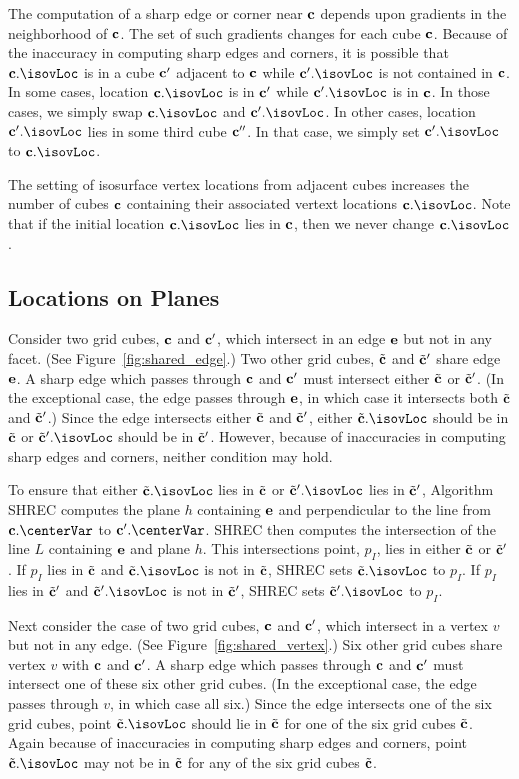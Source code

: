 The computation of a sharp edge or corner near $\mathbf{c}$ depends
upon gradients in the neighborhood of $\mathbf{c}$.
The set of such gradients changes for each cube $\mathbf{c}$.
Because of the inaccuracy in computing sharp edges and corners,
it is possible that $\cb.\isovLoc$ is in a cube $\mathbf{c}'$ adjacent to $\mathbf{c}$
while $\cb'.\isovLoc$ is not contained in $\mathbf{c}$.
In some cases,
location $\cb.\isovLoc$ is in $\mathbf{c}'$ while $\cb'.\isovLoc$ is in $\mathbf{c}$.
In those cases,
we simply swap $\cb.\isovLoc$ and $\cb'.\isovLoc$.
In other cases, location $\cb'.\isovLoc$ lies in some third cube $\mathbf{c}''$.
In that case, we simply set $\cb'.\isovLoc$ to $\cb.\isovLoc$.

The setting of isosurface vertex locations from adjacent cubes
increases the number of cubes $\mathbf{c}$ containing 
their associated vertext locations $\cb.\isovLoc$.
Note that if the initial location $\cb.\isovLoc$ lies in $\mathbf{c}$,
then we never change $\cb.\isovLoc$.


\subsection{Locations on Planes}

Consider two grid cubes, $\mathbf{c}$ and $\mathbf{c}'$, 
which intersect in an edge $\mathbf{e}$ but not in any facet.
(See Figure~\ref{fig:shared_edge}.)
Two other grid cubes, ${\tilde{\mathbf{c}}}$ and ${\tilde{\mathbf{c}}}'$ share edge $\mathbf{e}$.
A sharp edge which passes through $\mathbf{c}$ and $\mathbf{c}'$ must intersect
either ${\tilde{\mathbf{c}}}$ or ${\tilde{\mathbf{c}}}'$.
(In the exceptional case, the edge passes through $\mathbf{e}$,
in which case it intersects both ${\tilde{\mathbf{c}}}$ and ${\tilde{\mathbf{c}}}'$.)
Since the edge intersects either ${\tilde{\mathbf{c}}}$ and ${\tilde{\mathbf{c}}}'$,
either $\tcb.\isovLoc$ should be in ${\tilde{\mathbf{c}}}$ 
or $\tcb'.\isovLoc$ should be in ${\tilde{\mathbf{c}}}'$.
However, because of inaccuracies in computing sharp edges and corners,
neither condition may hold.

To ensure that either $\tcb.\isovLoc$ lies in ${\tilde{\mathbf{c}}}$
or $\tcb'.\isovLoc$ lies in ${\tilde{\mathbf{c}}}'$,
Algorithm SHREC computes the plane $h$ containing $\mathbf{e}$
and perpendicular to the line from $\cb.\centerVar$ to $\cb'.\centerVar$.
SHREC then computes the intersection of the line $L$ containing $\mathbf{e}$
and plane $h$.
This intersections point, $p_I$, lies in either ${\tilde{\mathbf{c}}}$ or ${\tilde{\mathbf{c}}}'$.
If $p_I$ lies in ${\tilde{\mathbf{c}}}$ and $\tcb.\isovLoc$ is not in ${\tilde{\mathbf{c}}}$,
SHREC sets $\tcb.\isovLoc$ to $p_I$.
If $p_I$ lies in ${\tilde{\mathbf{c}}}'$ and $\tcb'.\isovLoc$ is not in ${\tilde{\mathbf{c}}}'$,
SHREC sets $\tcb'.\isovLoc$ to $p_I$.

Next consider the case of two grid cubes, $\mathbf{c}$ and $\mathbf{c}'$, 
which intersect in a vertex $v$ but not in any edge.
(See Figure~\ref{fig:shared_vertex}.)
Six other grid cubes share vertex $v$ with $\mathbf{c}$ and $\mathbf{c}'$.
A sharp edge which passes through $\mathbf{c}$ and $\mathbf{c}'$ must intersect
one of these six other grid cubes.
(In the exceptional case, the edge passes through $v$,
in which case all six.)
Since the edge intersects one of the six grid cubes,
point $\tcb.\isovLoc$ should lie in ${\tilde{\mathbf{c}}}$ for one of the six grid cubes ${\tilde{\mathbf{c}}}$.
Again because of inaccuracies in computing sharp edges and corners,
point $\tcb.\isovLoc$ may not be in ${\tilde{\mathbf{c}}}$ for any of the six grid cubes ${\tilde{\mathbf{c}}}$.


